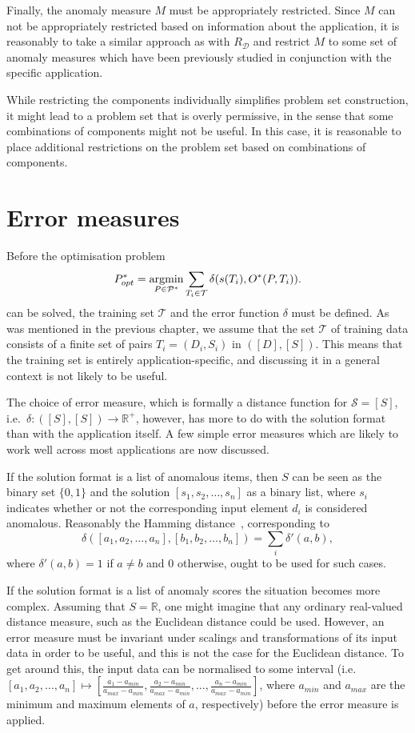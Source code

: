 Finally, the anomaly measure $M$ must be appropriately restricted. Since $M$ can not be appropriately restricted based on information about the application, it is reasonably to take a similar approach as with $R_{\mathcal{D}}$ and restrict $M$ to some set of anomaly measures which have been previously studied in conjunction with the specific application.

While restricting the components individually simplifies problem set construction, it might lead to a problem set that is overly permissive, in the sense that some combinations of components might not be useful. In this case, it is reasonable to place additional restrictions on the problem set based on combinations of components.

\section{Error measures}

Before the optimisation problem
\[
    P^*_{opt} = \argmin_{P \in \mathcal{P}^*} \sum_{T_i \in \mathcal{T}} \delta(s(T_i), O^*(P, T_i)).
\]
can be solved, the training set $\mathcal{T}$ and the error function $\delta$ must be defined. As was mentioned in the previous chapter, we assume that the set $\mathcal{T}$ of training data consists of a finite set of pairs $T_i = (D_i, S_i)$ in $([D], [S])$. This means that the training set is entirely application-specific, and discussing it in a general context is not likely to be useful.

The choice of error measure, which is formally a distance function for $\mathcal{S} = [S]$, i.e.\ $\delta: ([S], [S]) \rightarrow \mathbb{R}^+$, however, has more to do with the solution format than with the application itself. A few simple error measures which are likely to work well across most applications are now discussed.

If the solution format is a list of anomalous items, then $S$ can be seen as the binary set $\{0, 1\}$ and the solution $[s_1, s_2, \dots, s_n]$ as a binary list, where $s_i$ indicates whether or not the corresponding input element $d_i$ is considered anomalous. Reasonably the Hamming distance~\cite{TODO}, corresponding to
\[
    \delta([a_1, a_2, \dots, a_n], [b_1, b_2, \dots, b_n]) = \sum_i \delta'(a, b),
\]
where $\delta'(a, b) = 1$ if $a \neq b$ and $0$ otherwise, ought to be used for such cases.

If the solution format is a list of anomaly scores the situation becomes more complex. Assuming that $S = \mathbb{R}$, one might imagine that any ordinary real-valued distance measure, such as the Euclidean distance could be used. However, an error measure must be invariant under scalings and transformations of its input data in order to be useful, and this is not the case for the Euclidean distance. To get around this, the input data can be normalised to some interval (i.e.\ $[a_1, a_2, \dots, a_n] \mapsto [\frac{a_1 - a_{min}}{a_{max} - a_{min}}, \frac{a_2 - a_{min}}{a_{max} - a_{min}}, \dots, \frac{a_n - a_{min}}{a_{max} - a_{min}}]$, where $a_{min}$ and $a_{max}$ are the minimum and maximum elements of $a$, respectively) before the error measure is applied.

